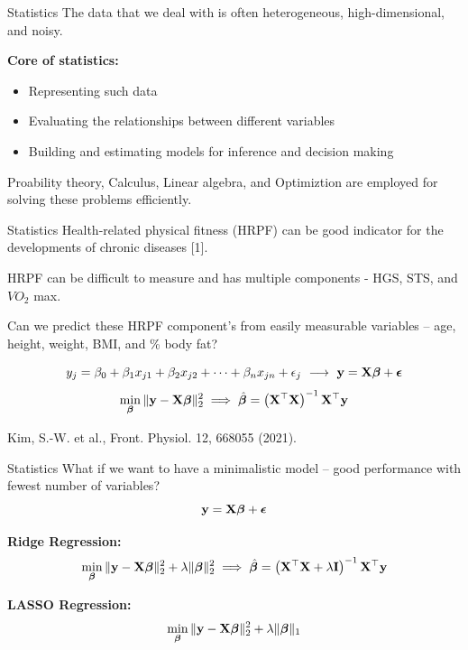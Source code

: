 \documentclass[aspectratio=169]{beamer}
\let\olditem\item
\renewcommand{\item}{\setlength{\itemsep}{\fill}\olditem}
\def\mf{\ensuremath\mathbf}
\def\lp{\ensuremath\left(}
\def\rp{\ensuremath\right)}
\begin{document}
\begin{frame}{Statistics}
  The data that we deal with is often heterogeneous, high-dimensional, and noisy.
  \vspace{1cm}
  
  \textbf{Core of statistics:}
  \begin{itemize}
    \item Representing such data
    \item Evaluating the relationships between different variables
    \item Building and estimating models for inference and decision making
  \end{itemize}
  \vspace{1cm}
  
  Proability theory, Calculus, Linear algebra, and Optimiztion are employed for solving these problems efficiently.
\end{frame}


\begin{frame}{Statistics}
  Health-related physical fitness (HRPF) can be good indicator for the developments of chronic diseases [1].

  HRPF can be difficult to measure and has multiple components - HGS, STS, and $VO_2$ max.
  
  Can we predict these HRPF component's from easily measurable variables -- age, height, weight, BMI, and \% body fat?

  \[ y_j = \beta_0 + \beta_1 x_{j1} + \beta_2 x_{j2} + \cdots + \beta_n x_{jn} + \epsilon_j \,\, \longrightarrow \,\, \mf{y} = \mf{X}\bm{\beta} + \bm{\epsilon} \]
  \[ \min_{\bm{\beta}} \Vert \mf{y} - \mf{X}\bm{\beta}\Vert_2^2 \implies \hat{\bm{\beta}} = \lp \mf{X}^\top{\mf{X}} \rp^{-1}\mf{X}^\top\mf{y} \]

  \vspace{0.75cm}

  \begin{small}
    [1] Kim, S.-W. et al., Front. Physiol. 12, 668055 (2021).
  \end{small}
\end{frame}


\begin{frame}{Statistics}
  What if we want to have a minimalistic model --  good performance with fewest number of variables?
  \[ \mf{y} = \mf{X}\bm{\beta} + \bm{\epsilon} \]

  \textbf{Ridge Regression:}
  \[ \min_{\bm{\beta}} \Vert \mf{y} - \mf{X}\bm{\beta}\Vert_2^2 + \lambda \Vert \bm{\beta} \Vert_2^2 \implies \hat{\bm{\beta}} = \lp \mf{X}^\top{\mf{X}} + \lambda \mf{I} \rp^{-1}\mf{X}^\top\mf{y} \]

  \vspace{0.7cm}

  \textbf{LASSO Regression:}
  \[ \min_{\bm{\beta}} \Vert \mf{y} - \mf{X}\bm{\beta}\Vert_2^2 + \lambda \Vert \bm{\beta} \Vert_1 \]
\end{frame}
\end{document}
